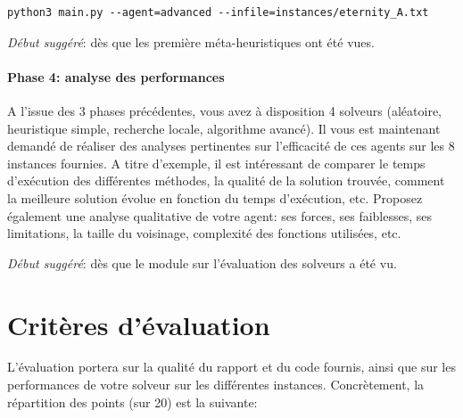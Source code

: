 \documentclass[a4paper,11pt,final,fleqn]{article}
\begin{document}
\begin{lstlisting}
python3 main.py --agent=advanced --infile=instances/eternity_A.txt 
\end{lstlisting}

\textit{Début suggéré}: dès que les première méta-heuristiques ont été vues.


\paragraph{Phase 4: analyse des performances} A l'issue des 3 phases précédentes, vous avez à disposition 4 solveurs (aléatoire, heuristique simple, recherche locale, algorithme avancé). Il vous est maintenant demandé de réaliser des analyses pertinentes sur l'efficacité de ces agents sur les 8 instances fournies. A titre d'exemple, il est intéressant de comparer le temps d'exécution des différentes méthodes, la qualité de la solution trouvée, comment la meilleure solution évolue en fonction du temps d'exécution, etc. Proposez également une analyse qualitative de votre agent: ses forces, ses faiblesses, ses limitations,  la taille du voisinage, complexité des fonctions utilisées, etc.

\textit{Début suggéré}: dès que le module sur l'évaluation des solveurs a été vu.

\section*{Critères d'évaluation}

L'évaluation portera sur la qualité du rapport et du code fournis, ainsi que sur les performances de votre solveur sur les différentes instances.
Concrètement, la répartition des points (sur 20) est la suivante:
\end{document}
